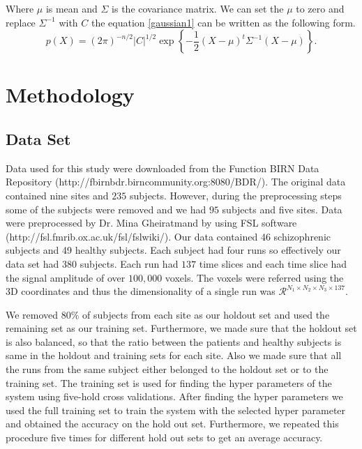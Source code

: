 \documentclass{article} %
\begin{document}
Where $ \mu $   is mean and $ \Sigma $ is the covariance matrix. We can set the $ \mu$ to zero and replace $\Sigma^{-1}$ with $C$ the equation \eqref{gaussian1} can be written as the following form.
\begin{equation}\label{gaussian2}
p(X) = (2\pi)^{-n/2} |C|^{1/2} \exp\left\{ -\frac{1}{2}(X - \mu)^t \Sigma^{-1} (X - \mu) \right\}.
\end{equation}
\section{Methodology}

\subsection{Data Set}
Data used for this study were downloaded from the Function BIRN Data Repository (http://fbirnbdr.birncommunity.org:8080/BDR/). The original data contained nine sites and $235$ subjects. However, during the preprocessing steps some of the subjects were removed and we had $95$ subjects and five sites. Data were preprocessed by Dr. Mina Gheiratmand by using FSL software (http://fsl.fmrib.ox.ac.uk/fsl/fslwiki/). Our data contained 46 schizophrenic subjects and 49 healthy subjects. Each subject had four runs so effectively our data set had $380$ subjects. Each run had $137$ time slices and each time slice had the signal amplitude of over $100,000$ voxels. The voxels were referred using the 3D coordinates and thus the dimensionality of a single run was $\mathcal R^{N_1\times N_2\times N_3 \times 137}$.

We removed $80\%$ of subjects from each site as our holdout set and used the remaining set as our training set. Furthermore, we made sure that the holdout set is also balanced, so that the ratio between the patients and healthy subjects is same in the holdout and training sets for each site. Also we made sure that all the runs from the same subject either belonged to the holdout set or to the training set. The training set is used for finding the hyper parameters of the system using five-hold cross validations. After finding the hyper parameters we used the full training set to train the system with the selected hyper parameter and obtained the accuracy on the hold out set. Furthermore, we repeated this procedure five times for different hold out sets to get an average accuracy. 
\end{document}
